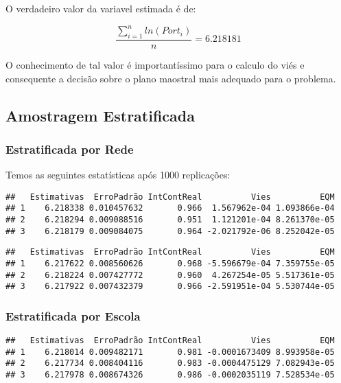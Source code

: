 \documentclass[sn-basic,pdflatex]{sn-jnl}
\theoremstyle{remark}
\theoremstyle{definition}
\begin{document}
O verdadeiro valor da variavel estimada é de:

\[
\frac{\sum_{i=1}^n{ln(Port_i)}}{n} = 6.218181
\]

O conhecimento de tal valor é importantíssimo para o calculo do viés e
consequente a decisão sobre o plano maostral mais adequado para o
problema.

\hypertarget{amostragem-estratificada}{%
\subsection{Amostragem Estratificada}\label{amostragem-estratificada}}

\hypertarget{estratificada-por-rede}{%
\subsubsection{Estratificada por Rede}\label{estratificada-por-rede}}

Temos as seguintes estatísticas após 1000 replicações:

\begin{verbatim}
##   Estimativas  ErroPadrão IntContReal          Vies          EQM
## 1    6.218338 0.010457632       0.966  1.567962e-04 1.093866e-04
## 2    6.218294 0.009088516       0.951  1.121201e-04 8.261370e-05
## 3    6.218179 0.009084075       0.964 -2.021792e-06 8.252042e-05
\end{verbatim}

\begin{verbatim}
##   Estimativas  ErroPadrão IntContReal          Vies          EQM
## 1    6.217622 0.008560626       0.968 -5.596679e-04 7.359755e-05
## 2    6.218224 0.007427772       0.960  4.267254e-05 5.517361e-05
## 3    6.217922 0.007432379       0.966 -2.591951e-04 5.530744e-05
\end{verbatim}

\hypertarget{estratificada-por-escola}{%
\subsubsection{Estratificada por
Escola}\label{estratificada-por-escola}}

\begin{verbatim}
##   Estimativas  ErroPadrão IntContReal          Vies          EQM
## 1    6.218014 0.009482171       0.981 -0.0001673409 8.993958e-05
## 2    6.217734 0.008404116       0.983 -0.0004475129 7.082943e-05
## 3    6.217978 0.008674326       0.986 -0.0002035119 7.528534e-05
\end{verbatim}
\end{document}
